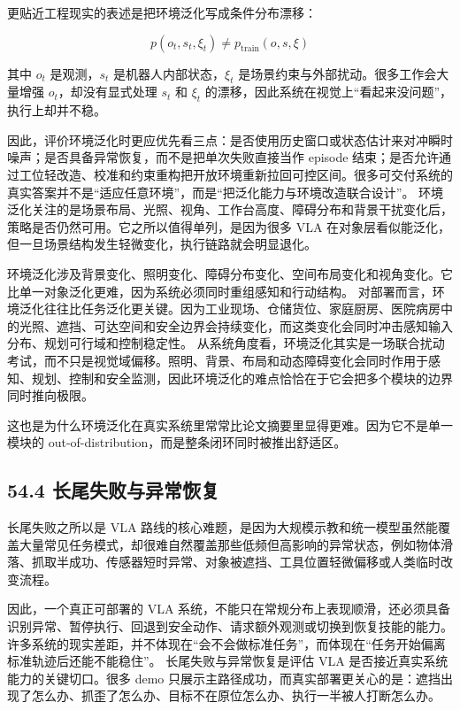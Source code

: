 更贴近工程现实的表述是把环境泛化写成条件分布漂移：

\begin{equation*}
p(o_t, s_t, \xi_t) \neq p_{\mathrm{train}}(o, s, \xi)
\end{equation*}

其中 \(o_t\) 是观测，\(s_t\) 是机器人内部状态，\(\xi_t\) 是场景约束与外部扰动。很多工作会大量增强 \(o_t\)，却没有显式处理 \(s_t\) 和 \(\xi_t\) 的漂移，因此系统在视觉上“看起来没问题”，执行上却并不稳。

因此，评价环境泛化时更应优先看三点：是否使用历史窗口或状态估计来对冲瞬时噪声；是否具备异常恢复，而不是把单次失败直接当作 episode 结束；是否允许通过工位轻改造、校准和约束重构把开放环境重新拉回可控区间。很多可交付系统的真实答案并不是“适应任意环境”，而是“把泛化能力与环境改造联合设计”。 环境泛化关注的是场景布局、光照、视角、工作台高度、障碍分布和背景干扰变化后，策略是否仍然可用。它之所以值得单列，是因为很多 VLA 在对象层看似能泛化，但一旦场景结构发生轻微变化，执行链路就会明显退化。

环境泛化涉及背景变化、照明变化、障碍分布变化、空间布局变化和视角变化。它比单一对象泛化更难，因为系统必须同时重组感知和行动结构。 对部署而言，环境泛化往往比任务泛化更关键。因为工业现场、仓储货位、家庭厨房、医院病房中的光照、遮挡、可达空间和安全边界会持续变化，而这类变化会同时冲击感知输入分布、规划可行域和控制稳定性。 从系统角度看，环境泛化其实是一场联合扰动考试，而不只是视觉域偏移。照明、背景、布局和动态障碍变化会同时作用于感知、规划、控制和安全监测，因此环境泛化的难点恰恰在于它会把多个模块的边界同时推向极限。

这也是为什么环境泛化在真实系统里常常比论文摘要里显得更难。因为它不是单一模块的 out-of-distribution，而是整条闭环同时被推出舒适区。

\subsection*{54.4 长尾失败与异常恢复}


长尾失败之所以是 VLA 路线的核心难题，是因为大规模示教和统一模型虽然能覆盖大量常见任务模式，却很难自然覆盖那些低频但高影响的异常状态，例如物体滑落、抓取半成功、传感器短时异常、对象被遮挡、工具位置轻微偏移或人类临时改变流程。

因此，一个真正可部署的 VLA 系统，不能只在常规分布上表现顺滑，还必须具备识别异常、暂停执行、回退到安全动作、请求额外观测或切换到恢复技能的能力。许多系统的现实差距，并不体现在“会不会做标准任务”，而体现在“任务开始偏离标准轨迹后还能不能稳住”。 长尾失败与异常恢复是评估 VLA 是否接近真实系统能力的关键切口。很多 demo 只展示主路径成功，而真实部署更关心的是：遮挡出现了怎么办、抓歪了怎么办、目标不在原位怎么办、执行一半被人打断怎么办。

